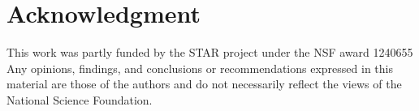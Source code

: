 \section*{Acknowledgment}

This work was partly funded by the STAR project under the NSF award 1240655 Any opinions, findings, and conclusions or recommendations expressed in this material are those of the authors and do not necessarily reflect the views of the National Science Foundation.

